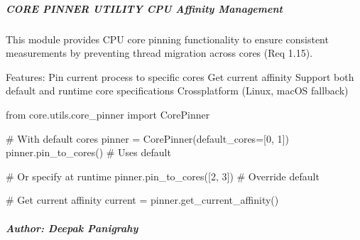 \documentclass[letterpaper,10pt,english]{sphinxmanual}
\begin{document}
\subparagraph{CORE PINNER UTILITY \textendash{} CPU Affinity Management}
\label{\detokenize{core.utils.core_pinner:core-pinner-utility-cpu-affinity-management}}
\sphinxAtStartPar
This module provides CPU core pinning functionality to ensure consistent
measurements by preventing thread migration across cores (Req 1.15).

\sphinxAtStartPar
Features:
\sphinxhyphen{} Pin current process to specific cores
\sphinxhyphen{} Get current affinity
\sphinxhyphen{} Support both default and runtime core specifications
\sphinxhyphen{} Cross\sphinxhyphen{}platform (Linux, macOS fallback)
\begin{description}
\sphinxAtStartPar
from core.utils.core\_pinner import CorePinner

\sphinxAtStartPar
\# With default cores
pinner = CorePinner(default\_cores={[}0, 1{]})
pinner.pin\_to\_cores()  \# Uses default

\sphinxAtStartPar
\# Or specify at runtime
pinner.pin\_to\_cores({[}2, 3{]})  \# Override default

\sphinxAtStartPar
\# Get current affinity
current = pinner.get\_current\_affinity()

\end{description}


\subparagraph{Author: Deepak Panigrahy}
\label{\detokenize{core.utils.core_pinner:author-deepak-panigrahy}}
\end{document}
